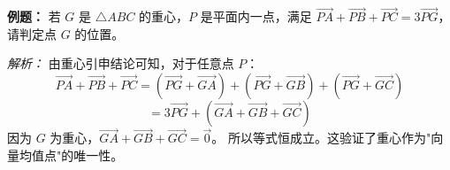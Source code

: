 \begin{examplebox}
\textbf{例题：} 若 $G$ 是 $\triangle ABC$ 的重心，$P$ 是平面内一点，满足 $\vec{PA} + \vec{PB} + \vec{PC} = 3\vec{PG}$，请判定点 $G$ 的位置。

\textit{解析：} 
由重心引申结论可知，对于任意点 $P$：
\[ \vec{PA} + \vec{PB} + \vec{PC} = (\vec{PG}+\vec{GA}) + (\vec{PG}+\vec{GB}) + (\vec{PG}+\vec{GC}) \]
\[ = 3\vec{PG} + (\vec{GA} + \vec{GB} + \vec{GC}) \]
因为 $G$ 为重心，$\vec{GA} + \vec{GB} + \vec{GC} = \vec{0}$。
所以等式恒成立。这验证了重心作为"向量均值点"的唯一性。
\end{examplebox}